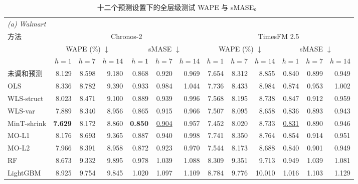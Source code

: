 \begin{table}[!htbp]
\centering
\begingroup
\renewcommand{\baselinestretch}{1}\small
\caption{十二个预测设置下的全层级测试 WAPE 与 sMASE。}
\label{tab:main_wape}
\fontsize{8.5}{10}\selectfont
\renewcommand{\arraystretch}{0.95}
\setlength{\tabcolsep}{2pt}
\begin{tabular*}{\textwidth}{@{\extracolsep{\fill}}l*{12}{r}@{}}
\toprule
\multicolumn{13}{l}{\textit{(a) Walmart}} \\
方法 & \multicolumn{6}{c}{Chronos-2} & \multicolumn{6}{c}{TimesFM 2.5} \\
\cmidrule(lr){2-7}\cmidrule(l){8-13}
 & \multicolumn{3}{c}{WAPE (\%) $\downarrow$} & \multicolumn{3}{c}{sMASE $\downarrow$} & \multicolumn{3}{c}{WAPE (\%) $\downarrow$} & \multicolumn{3}{c}{sMASE $\downarrow$} \\
\cmidrule(lr){2-4}\cmidrule(lr){5-7}\cmidrule(lr){8-10}\cmidrule(l){11-13}
 & $h=1$ & $h=7$ & $h=14$ & $h=1$ & $h=7$ & $h=14$ & $h=1$ & $h=7$ & $h=14$ & $h=1$ & $h=7$ & $h=14$ \\
\midrule
未调和预测 & 8.129 & 8.598 & 9.180 & 0.868 & 0.920 & 0.969 & 7.654 & 8.312 & 8.855 & 0.840 & 0.899 & 0.949 \\
OLS & 8.336 & 8.782 & 9.390 & 0.933 & 0.984 & 1.044 & 7.736 & 8.433 & 8.984 & 0.874 & 0.953 & 1.002 \\
WLS-struct & 8.023 & 8.471 & 9.100 & 0.889 & 0.939 & 0.996 & 7.568 & 8.195 & 8.738 & 0.847 & 0.912 & 0.959 \\
WLS-var & 7.889 & 8.340 & 8.956 & 0.865 & 0.915 & 0.966 & 7.507 & 8.095 & 8.658 & 0.836 & 0.893 & 0.943 \\
MinT-shrink & \cellcolor{accuracybest}\textbf{7.629} & 8.172 & 8.860 & \cellcolor{accuracybest}\textbf{0.850} & \cellcolor{accuracysecond}\underline{0.904} & 0.957 & 7.452 & 8.020 & 8.733 & \cellcolor{accuracysecond}\underline{0.831} & 0.890 & 0.946 \\
MO-L1 & 8.176 & 8.693 & 9.365 & 0.887 & 0.940 & 0.998 & 7.741 & 8.350 & 8.764 & 0.854 & 0.914 & 0.951 \\
MO-L2 & 7.966 & 8.391 & 8.958 & 0.872 & 0.923 & 0.970 & 7.544 & 8.173 & 8.688 & 0.840 & 0.901 & 0.949 \\
RF & 8.673 & 9.332 & 9.895 & 0.978 & 1.039 & 1.088 & 8.309 & 9.351 & 9.713 & 0.949 & 1.039 & 1.081 \\
LightGBM & 8.925 & 9.754 & 9.845 & 1.020 & 1.097 & 1.109 & 8.784 & 9.776 & 10.010 & 1.016 & 1.103 & 1.129 \\

\end{tabular*}
\end{table}
